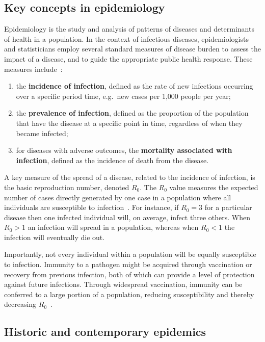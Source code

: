 \subsection{Key concepts in epidemiology}

Epidemiology is the study and analysis of patterns of diseases and determinants of health in a population. In the context of infectious diseases, epidemiologists and statisticians employ several standard measures of disease burden to assess the impact of a disease, and to guide the appropriate public health response. These measures include~\parencite{Coggon1978-no}:

\begin{enumerate}
  \item the \textbf{incidence of infection}, defined as the rate of new infections occurring over a specific period time, e.g.\ new cases per 1,000 people per year;
  \item the \textbf{prevalence of infection}, defined as the proportion of the population that have the disease at a specific point in time, regardless of when they became infected;
  \item for diseases with adverse outcomes, the \textbf{mortality associated with infection}, defined as the incidence of death from the disease.
\end{enumerate}

A key measure of the spread of a disease, related to the incidence of infection, is the basic reproduction number, denoted $R_0$. The $R_0$ value measures the expected number of cases directly generated by one case in a population where all individuals are susceptible to infection~\parencite{Lipsitch2003-hb}. For instance, if $R_0 = 3$ for a particular disease then one infected individual will, on average, infect three others. When $R_0>1$ an infection will spread in a population, whereas when $R_0<1$ the infection will eventually die out.

Importantly, not every individual within a population will be equally susceptible to infection. Immunity to a pathogen might be acquired through vaccination or recovery from previous infection, both of which can provide a level of protection against future infections. Through widespread vaccination, immunity can be conferred to a large portion of a population, reducing susceptibility and thereby decreasing $R_0$~\parencite{Mongin2023-gj}.

\subsection{Historic and contemporary epidemics}

